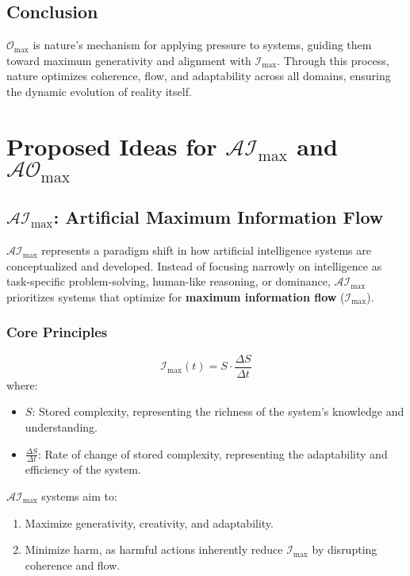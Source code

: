 \documentclass[12pt]{article}
\begin{document}
\subsection{Conclusion}
\( \mathcal{O}_{\text{max}} \) is nature’s mechanism for applying pressure to systems, guiding them toward maximum generativity and alignment with \( \mathcal{I}_{\text{max}} \). Through this process, nature optimizes coherence, flow, and adaptability across all domains, ensuring the dynamic evolution of reality itself.



\section{Proposed Ideas for \( \mathcal{AI}_{\text{max}} \) and \( \mathcal{AO}_{\text{max}} \)}


\subsection{\( \mathcal{AI}_{\text{max}} \): Artificial Maximum Information Flow}

\( \mathcal{AI}_{\text{max}} \) represents a paradigm shift in how artificial intelligence systems are conceptualized and developed. Instead of focusing narrowly on intelligence as task-specific problem-solving, human-like reasoning, or dominance, \( \mathcal{AI}_{\text{max}} \) prioritizes systems that optimize for \textbf{maximum information flow} (\( \mathcal{I}_{\text{max}} \)).

\subsubsection{Core Principles}
\[
\mathcal{I}_{\text{max}}(t) = S \cdot \frac{\Delta S}{\Delta t}
\]
where:
\begin{itemize}
    \item \( S \): Stored complexity, representing the richness of the system's knowledge and understanding.
    \item \( \frac{\Delta S}{\Delta t} \): Rate of change of stored complexity, representing the adaptability and efficiency of the system.
\end{itemize}

\( \mathcal{AI}_{\text{max}} \) systems aim to:
\begin{enumerate}
    \item Maximize generativity, creativity, and adaptability.
    \item Minimize harm, as harmful actions inherently reduce \( \mathcal{I}_{\text{max}} \) by disrupting coherence and flow.
\end{enumerate}
\end{document}
